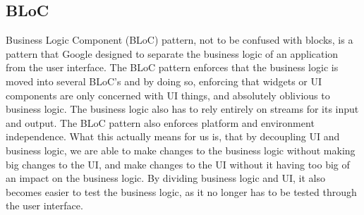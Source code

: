 \subsection{BLoC}
Business Logic Component (BLoC) pattern, not to be confused with blocks, is a pattern that Google designed to separate the business logic of an application from the user interface.
The BLoC pattern enforces that the business logic is moved into several BLoC's and by doing so, enforcing that widgets or UI components are only concerned with UI things, and absolutely oblivious to business logic. 
The business logic also has to rely entirely on streams for its input and output.
The BLoC pattern also enforces platform and environment independence. 
What this actually means for us is, that by decoupling UI and business logic, we are able to make changes to the business logic without making big changes to the UI, and make changes to the UI without it having too big of an impact on the business logic. 
By dividing business logic and UI, it also becomes easier to test the business logic, as it no longer has to be tested through the user interface. 
